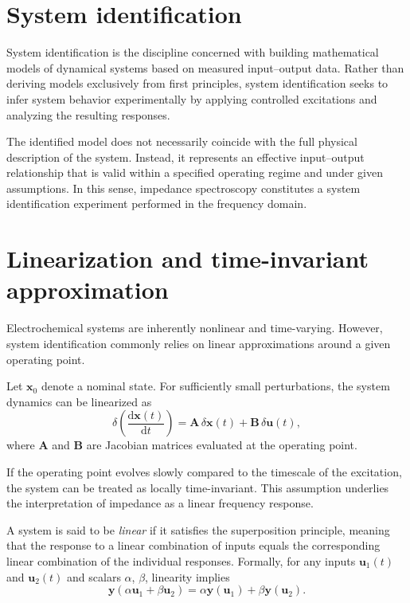 \section{System identification}

System identification is the discipline concerned with building mathematical models of dynamical systems based on measured input--output data.
Rather than deriving models exclusively from first principles, system identification seeks to infer system behavior experimentally by applying controlled excitations and analyzing the resulting responses.

The identified model does not necessarily coincide with the full physical description of the system.
Instead, it represents an effective input--output relationship that is valid within a specified operating regime and under given assumptions.
In this sense, impedance spectroscopy constitutes a system identification experiment performed in the frequency domain.

\section{Linearization and time-invariant approximation}

Electrochemical systems are inherently nonlinear and time-varying.
However, system identification commonly relies on linear approximations around a given operating point.

Let $\mathbf{x}_0$ denote a nominal state.
For sufficiently small perturbations, the system dynamics can be linearized as
\begin{equation}
    \delta \left( \frac{\mathrm{d}\mathbf{x}(t)}{\mathrm{d}t} \right) = \mathbf{A}\,\delta\mathbf{x}(t) + \mathbf{B}\,\delta\mathbf{u}(t),
\end{equation}
where $\mathbf{A}$ and $\mathbf{B}$ are Jacobian matrices evaluated at the operating point.

If the operating point evolves slowly compared to the timescale of the excitation, the system can be treated as locally time-invariant.
This assumption underlies the interpretation of impedance as a linear frequency response.

A system is said to be \emph{linear} if it satisfies the superposition principle, meaning that the response to a linear combination of inputs equals the corresponding linear combination of the individual responses.
Formally, for any inputs $\mathbf{u}_1(t)$ and $\mathbf{u}_2(t)$ and scalars $\alpha$, $\beta$, linearity implies
\[
\mathbf{y}\!\left(\alpha \mathbf{u}_1 + \beta \mathbf{u}_2\right)
= \alpha \mathbf{y}\!\left(\mathbf{u}_1\right) + \beta \mathbf{y}\!\left(\mathbf{u}_2\right).
\]

